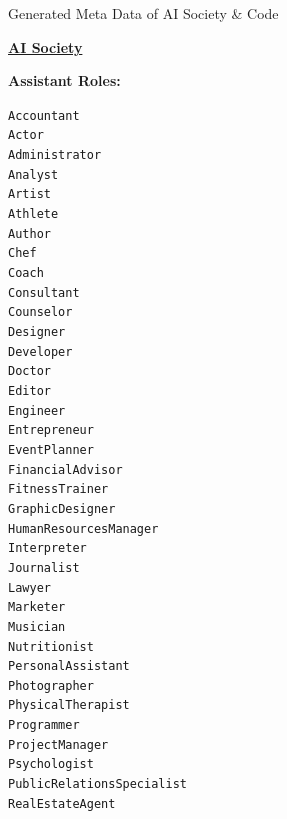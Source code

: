 \begin{figure}[h]
	\begin{AIBox}{Generated Meta Data of AI Society \& Code}
		{
			\parbox[t][][t]{0.5\textwidth}{{\bf \underline{AI Society}}\\

				\parbox[t][][t]{0.28\textwidth}{{\small \bf Assistant Roles:} \scriptsize\begin{alltt}
						Accountant \\
						Actor \\
						Administrator \\
						Analyst \\
						Artist \\
						Athlete \\
						Author \\
						Chef \\
						Coach \\
						Consultant \\
						Counselor \\
						Designer \\
						Developer \\
						Doctor \\
						Editor \\
						Engineer \\
						Entrepreneur \\
						Event Planner \\
						Financial Advisor \\
						Fitness Trainer \\
						Graphic Designer \\
						Human Resources Manager \\
						Interpreter \\
						Journalist \\
						Lawyer \\
						Marketer \\
						Musician \\
						Nutritionist \\
						Personal Assistant \\
						Photographer \\
						Physical Therapist \\
						Programmer \\
						Project Manager \\
						Psychologist \\
						Public Relations Specialist \\
						Real Estate Agent \\

\end{alltt}}}}
\end{AIBox}
\end{figure}
